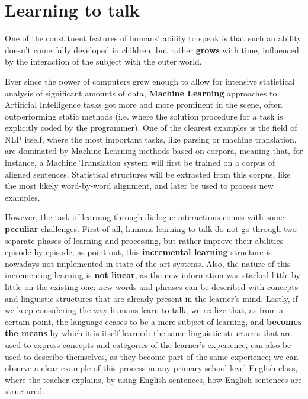 
\section{Learning to talk}

One of the constituent features of humans' ability to speak is that such an ability doesn't come fully developed in children, but rather \textbf{grows} with time, influenced by the interaction of the subject with the outer world.

Ever since the power of computers grew enough to allow for intensive statistical analysis of significant amounts of data, \textbf{Machine Learning} approaches to Artificial Intelligence tasks got more and more prominent in the scene, often outperforming static methods (i.e. where the solution procedure for a task is explicitly coded by the programmer).
One of the clearest examples is the field of NLP itself, where the most important tasks, like parsing or machine translation, are dominated by Machine Learning methods based on corpora,
meaning that, for instance, a Machine Translation system will first be trained on a corpus of aligned sentences. Statistical structures will be extracted from this corpus, like the most likely word-by-word alignment, and later be used to process new examples.

However, the task of learning through dialogue interactions comes with some \textbf{peculiar} challenges. First of all, humans learning to talk do not go through two separate phases of learning and processing, but rather improve their abilities episode by episode; as \cite{2095408} point out, this \textbf{incremental learning} structure is nowadays not implemented in state-of-the-art systems. Also, the nature of this incrementing learning is \textbf{not linear}, as the new information was stacked little by little on the existing one: new words and phrases can be described with concepts and linguistic structures that are already present in the learner's mind. Lastly, if we keep considering the way humans learn to talk, we realize that, as from a certain point, the language ceases to be a mere subject of learning, and \textbf{becomes the means} by which it is itself learned: the same linguistic structures that are used to express concepts and categories of the learner's experience, can also be used to describe themselves, as they become part of the same experience; we can observe a clear example of this process in any primary-school-level English class, where the teacher explains, by using English sentences, how English sentences are structured.

